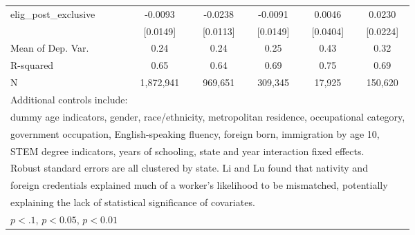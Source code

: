 \begin{table}[htbp]
\begin{tabular}{l*{5}{c}}
\addlinespace
elig\_post\_exclusive &     -0.0093         &     -0.0238\sym{*}  &     -0.0091         &      0.0046         &      0.0230         \\
                    &    [0.0149]         &    [0.0113]         &    [0.0149]         &    [0.0404]         &    [0.0224]         \\
\midrule
Mean of Dep. Var.   &        0.24         &        0.24         &        0.25         &        0.43         &        0.32         \\
R-squared           &        0.65         &        0.64         &        0.69         &        0.75         &        0.69         \\
N                   &   1,872,941         &     969,651         &     309,345         &      17,925         &     150,620         \\
\bottomrule
\multicolumn{6}{l}{\footnotesize Additional controls include:}\\
\multicolumn{6}{l}{\footnotesize dummy age indicators, gender, race/ethnicity, metropolitan residence, occupational category,}\\
\multicolumn{6}{l}{\footnotesize government occupation, English-speaking fluency, foreign born, immigration by age 10,}\\
\multicolumn{6}{l}{\footnotesize STEM degree indicators, years of schooling, state and year interaction fixed effects.}\\
\multicolumn{6}{l}{\footnotesize Robust standard errors are all clustered by state. Li and Lu found that nativity and}\\
\multicolumn{6}{l}{\footnotesize foreign credentials explained much of a worker's likelihood to be mismatched, potentially}\\
\multicolumn{6}{l}{\footnotesize explaining the lack of statistical significance of covariates.}\\
\multicolumn{6}{l}{\footnotesize \sym{*} \(p<.1\), \sym{**} \(p<0.05\), \sym{***} \(p<0.01\)}\\
\end{tabular}
\end{table}
